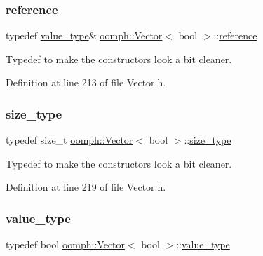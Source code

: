 \subsubsection{\texorpdfstring{reference}{reference}}
{\footnotesize\ttfamily typedef \hyperlink{classoomph_1_1Vector_3_01bool_01_4_ae0dcf1d783a209e5a9096b2292d8fab6}{value\+\_\+type}\& \hyperlink{classoomph_1_1Vector}{oomph\+::\+Vector}$<$ bool $>$\+::\hyperlink{classoomph_1_1Vector_3_01bool_01_4_aeb7603d575291ef47dcbade68b854f9a}{reference}}



Typedef to make the constructors look a bit cleaner. 



Definition at line 213 of file Vector.\+h.

\mbox{\label{classoomph_1_1Vector_3_01bool_01_4_a016848fc2d6e301e64a0209ade793732}} 
\subsubsection{\texorpdfstring{size\+\_\+type}{size\_type}}
{\footnotesize\ttfamily typedef size\+\_\+t \hyperlink{classoomph_1_1Vector}{oomph\+::\+Vector}$<$ bool $>$\+::\hyperlink{classoomph_1_1Vector_3_01bool_01_4_a016848fc2d6e301e64a0209ade793732}{size\+\_\+type}}



Typedef to make the constructors look a bit cleaner. 



Definition at line 219 of file Vector.\+h.

\mbox{\label{classoomph_1_1Vector_3_01bool_01_4_ae0dcf1d783a209e5a9096b2292d8fab6}} 
\subsubsection{\texorpdfstring{value\+\_\+type}{value\_type}}
{\footnotesize\ttfamily typedef bool \hyperlink{classoomph_1_1Vector}{oomph\+::\+Vector}$<$ bool $>$\+::\hyperlink{classoomph_1_1Vector_3_01bool_01_4_ae0dcf1d783a209e5a9096b2292d8fab6}{value\+\_\+type}}



